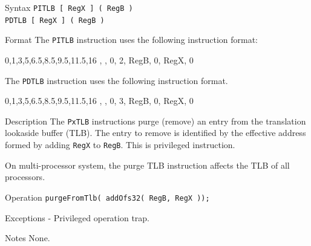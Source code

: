 %
%
\pagebreak
{}

\begin{iPageDescEntry}{Syntax}
    \texttt{PITLB [ RegX ] ( RegB )} \\
    \texttt{PDTLB [ RegX ] ( RegB )}
\end{iPageDescEntry}

\begin{iPageDescEntry}{Format}
    The \texttt{PITLB} instruction uses the following instruction format: \\

    \begin{flushleft}
    \drawInstrFormat
       {0,1,3,5,6.5,8.5,9.5,11.5,16}
        {\OpCodeGrpSYS, \OpCodePTLB, 0, 2, RegB, 0, RegX, 0}
    \end{flushleft}
    
    The \texttt{PDTLB} instruction uses the following instruction format. \\

    \begin{flushleft}
    \drawInstrFormat
       {0,1,3,5,6.5,8.5,9.5,11.5,16}
        {\OpCodeGrpSYS, \OpCodePTLB, 0, 3, RegB, 0, RegX, 0}
    \end{flushleft}
    
\end{iPageDescEntry}

\begin{iPageDescEntry}{Description}
    The \texttt{PxTLB} instructions purge (remove) an entry from the translation lookaside buffer (TLB). The entry to remove is identified by the effective address formed by adding \texttt{RegX} to \texttt{RegB}. This is privileged instruction.
    
    On multi-processor system, the purge TLB instruction affects the TLB of all processors.
\end{iPageDescEntry}

\begin{iPageDescEntry}{Operation}
    \texttt{purgeFromTlb( addOfs32( RegB, RegX ));}
\end{iPageDescEntry}


\begin{iPageDescEntry}{Exceptions}
    - Privileged operation trap.
\end{iPageDescEntry}

\begin{iPageDescEntry}{Notes}
   None.
\end{iPageDescEntry}
